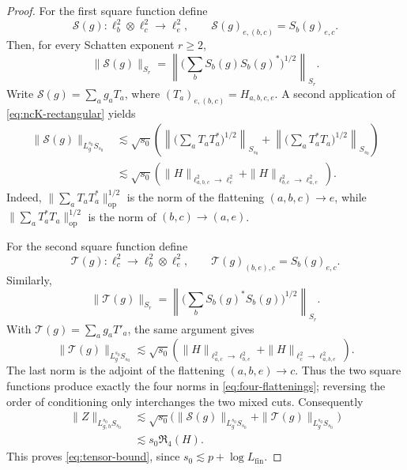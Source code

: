 \documentclass[11pt,reqno]{amsart}
\numberwithin{equation}{section}
\theoremstyle{plain}
\theoremstyle{definition}
\newcommand{\op}{\operatorname{op}}
\newcommand{\Lfin}{L_{\mathrm{fin}}}
\begin{document}
\begin{proof}
For the first square function define
\[
        \mathcal S(g):\ell^2_b\otimes\ell^2_c\longrightarrow\ell^2_e,
        \qquad
        \mathcal S(g)_{e,(b,c)}=S_b(g)_{e,c}.
\]
Then, for every Schatten exponent \(r\ge2\),
\[
        \|\mathcal S(g)\|_{S_r}
        =\left\|\Big(\sum_bS_b(g)S_b(g)^*\Big)^{1/2}\right\|_{S_r}.
\]
Write \(\mathcal S(g)=\sum_ag_aT_a\), where \((T_a)_{e,(b,c)}=H_{a,b,c,e}\).  A second application of \eqref{eq:ncK-rectangular} yields
\begin{equation}\label{eq:first-square-bound}
\begin{aligned}
        \|\mathcal S(g)\|_{L_g^{s_0}S_{s_0}}
        &\lesssim \sqrt {s_0}\left(
        \left\|\Big(\sum_aT_aT_a^*\Big)^{1/2}\right\|_{S_{s_0}}
        +
        \left\|\Big(\sum_aT_a^*T_a\Big)^{1/2}\right\|_{S_{s_0}}
        \right)\\
        &\lesssim \sqrt {s_0}\left(
        \|H\|_{\ell^2_{a,b,c}\to\ell^2_e}
        +
        \|H\|_{\ell^2_{b,c}\to\ell^2_{a,e}}
        \right).
\end{aligned}
\end{equation}
Indeed, \(\|\sum_aT_aT_a^*\|_{\op}^{1/2}\) is the norm of the flattening \((a,b,c)\to e\), while \(\|\sum_aT_a^*T_a\|_{\op}^{1/2}\) is the norm of \((b,c)\to(a,e)\).

For the second square function define
\[
        \mathcal T(g):\ell^2_c\longrightarrow\ell^2_b\otimes\ell^2_e,
        \qquad
        \mathcal T(g)_{(b,e),c}=S_b(g)_{e,c}.
\]
Similarly,
\[
        \|\mathcal T(g)\|_{S_r}
        =\left\|\Big(\sum_bS_b(g)^*S_b(g)\Big)^{1/2}\right\|_{S_r}.
\]
With \(\mathcal T(g)=\sum_ag_aT'_a\), the same argument gives
\begin{equation}\label{eq:second-square-bound}
        \|\mathcal T(g)\|_{L_g^{s_0}S_{s_0}}
        \lesssim \sqrt {s_0}\left(
        \|H\|_{\ell^2_{a,c}\to\ell^2_{b,e}}
        +
        \|H\|_{\ell^2_c\to\ell^2_{a,b,e}}
        \right).
\end{equation}
The last norm is the adjoint of the flattening
\((a,b,e)\to c\).  Thus the two square functions produce exactly the four
norms in \eqref{eq:four-flattenings}; reversing the order of conditioning
only interchanges the two mixed cuts.  Consequently
\[
\begin{aligned}
        \|Z\|_{L_{g,h}^{s_0}S_{s_0}}
        &\lesssim \sqrt{s_0}\bigl(
        \|\mathcal S(g)\|_{L_g^{s_0}S_{s_0}}
        +\|\mathcal T(g)\|_{L_g^{s_0}S_{s_0}}\bigr)\\
        &\lesssim s_0\mathfrak R_4(H).
\end{aligned}
\]
This proves \eqref{eq:tensor-bound}, since
\(s_0\lesssim p+\log\Lfin\).


\end{proof}
\end{document}
